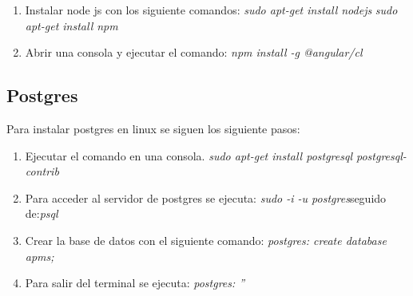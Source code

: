 \begin{enumerate}
  \item Instalar node js con los siguiente comandos:
  \textit{sudo apt-get install nodejs} 
  \newline\textit{sudo apt-get install npm}
  \item Abrir una consola y ejecutar el comando:
  \textit{npm install -g @angular/cl} 
\end{enumerate}

\subsection{Postgres}
Para instalar postgres en linux se siguen los siguiente pasos:

\begin{enumerate}
  \item Ejecutar el comando en una consola. 
  \textit{sudo apt-get install postgresql postgresql-contrib} 
  \item Para acceder al servidor de postgres se ejecuta:
  \textit{sudo -i -u postgres}seguido de:\textit{psql} 
  \item Crear la base de datos con el siguiente comando: 
  \textit{postgres: create database apms;} 
  \item Para salir del terminal se ejecuta:
  \textit{postgres: \q''} 
\end{enumerate}

